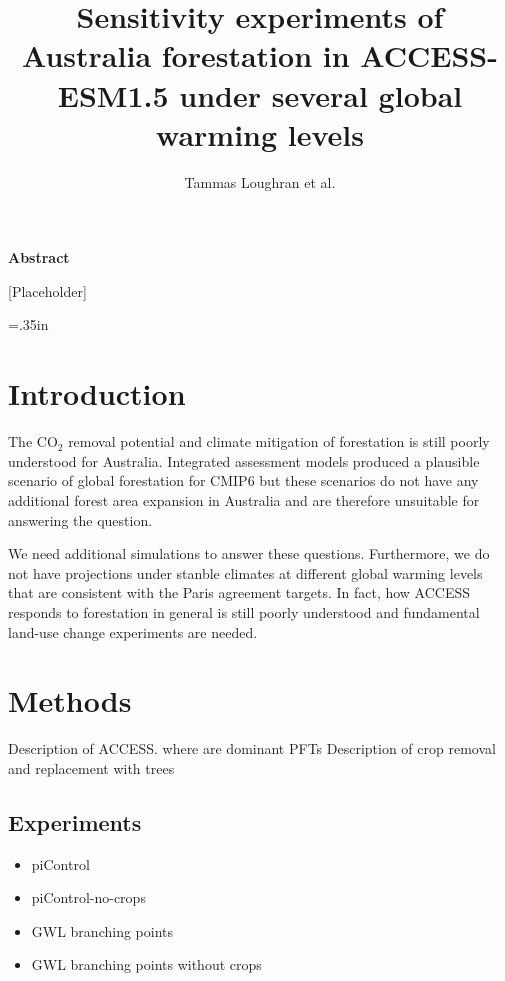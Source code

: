 \documentclass[]{article}
\title{Sensitivity experiments of Australia forestation in ACCESS-ESM1.5 under several global warming levels}
\author{Tammas Loughran et al.}
\begin{document}
\maketitle

\begin{center}
    \Large
    \vspace{0.9cm}
    \textbf{Abstract}
\end{center}

[Placeholder]

\raggedright
\parindent=.35in %

\section{Introduction}

The CO$_2$ removal potential and climate mitigation of forestation is still poorly understood for Australia.
Integrated assessment models produced a plausible scenario of global forestation for CMIP6 but these scenarios do not have any additional forest area expansion in Australia and are therefore unsuitable for answering the question.

We need additional simulations to answer these questions.
Furthermore, we do not have projections under stanble climates at different global warming levels that are consistent with the Paris agreement targets.
In fact, how ACCESS responds to forestation in general is still poorly understood and fundamental land-use change experiments are needed.

\section{Methods}

Description of ACCESS. where are dominant PFTs
Description of crop removal and replacement with trees

\subsection{Experiments}

\begin{itemize}
\item piControl
\item piControl-no-crops
\item GWL branching points
\item GWL branching points without crops
\end{itemize}
\end{document}
